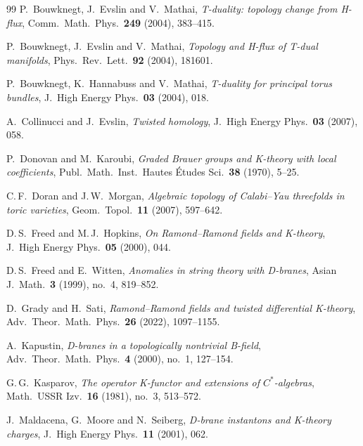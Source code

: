 \documentclass[reqno,11pt]{amsart}
\theoremstyle{definition}
\begin{document}
{\begin{thebibliography}{99}
P.~Bouwknegt, J.~Evslin and V.~Mathai,
\emph{T-duality: topology change from H-flux},
Comm.\ Math.\ Phys.\ \textbf{249} (2004), 383--415.

P.~Bouwknegt, J.~Evslin and V.~Mathai,
\emph{Topology and H-flux of T-dual manifolds},
Phys.\ Rev.\ Lett.\ \textbf{92} (2004), 181601.

P.~Bouwknegt, K.~Hannabuss and V.~Mathai,
\emph{T-duality for principal torus bundles},
J.\ High Energy Phys.\ \textbf{03} (2004), 018.

A.~Collinucci and J.~Evslin,
\emph{Twisted homology},
J.\ High Energy Phys.\ \textbf{03} (2007), 058.

P.~Donovan and M.~Karoubi,
\emph{Graded Brauer groups and K-theory with local coefficients},
Publ.\ Math.\ Inst.\ Hautes \'Etudes Sci.\ \textbf{38} (1970), 5--25.

C.\,F.~Doran and J.\,W.~Morgan,
\emph{Algebraic topology of Calabi--Yau threefolds in toric varieties},
Geom.\ Topol.\ \textbf{11} (2007), 597--642.

D.\,S.~Freed and M.\,J.~Hopkins,
\emph{On Ramond--Ramond fields and K-theory},
J.\ High Energy Phys.\ \textbf{05} (2000), 044.

D.\,S.~Freed and E.~Witten,
\emph{Anomalies in string theory with D-branes},
Asian J.\ Math.\ \textbf{3} (1999), no.~4, 819--852.

D.~Grady and H.~Sati,
\emph{Ramond--Ramond fields and twisted differential K-theory},
Adv.\ Theor.\ Math.\ Phys.\ \textbf{26} (2022), 1097--1155.

A.~Kapustin,
\emph{D-branes in a topologically nontrivial B-field},
Adv.\ Theor.\ Math.\ Phys.\ \textbf{4} (2000), no.~1, 127--154.

G.\,G.~Kasparov,
\emph{The operator K-functor and extensions of $C^*$-algebras},
Math.\ USSR Izv.\ \textbf{16} (1981), no.~3, 513--572.

J.~Maldacena, G.~Moore and N.~Seiberg,
\emph{D-brane instantons and K-theory charges},
J.\ High Energy Phys.\ \textbf{11} (2001), 062.


\end{thebibliography}}
\end{document}
